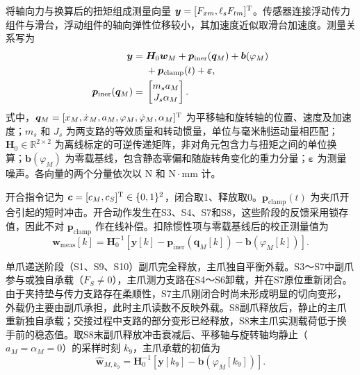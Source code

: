 \documentclass{JQRnew}
\begin{document}
将轴向力与换算后的扭矩组成测量向量 $\bm y=[F_{xm},\ell_sF_{tm}]^{\rm T}$。传感器连接浮动传力组件与滑台，浮动组件的轴向弹性位移较小，其加速度近似取滑台加速度。测量关系写为
\begin{align}
\label{eq:measurement}
\bm y={}&\bm H_0\bm w_M+\bm p_{\mathrm{iner}}(\bm q_M)
+\bm b(\varphi_M)\notag\\
&+\bm p_{\mathrm{clamp}}(t)+\bm\varepsilon,\\
\label{eq:inertia}
\bm p_{\mathrm{iner}}(\bm q_M)={}&
\begin{bmatrix}m_sa_M\\J_s\alpha_M\end{bmatrix}.
\end{align}
式中，$\bm q_M=[x_M,\dot x_M,a_M,\varphi_M,\dot\varphi_M,\alpha_M]^{\rm T}$ 为平移轴和旋转轴的位置、速度及加速度；$m_s$ 和 $J_s$ 为两支路的等效质量和转动惯量，单位与毫米制运动量相匹配；$\bm H_0\in\mathbb R^{2\times2}$ 为离线标定的可逆传递矩阵，非对角元包含力与扭矩之间的单位换算；$\bm b(\varphi_M)$ 为零载基线，包含静态零偏和随旋转角变化的重力分量；$\bm\varepsilon$ 为测量噪声。各向量的两个分量依次以 $\mathrm{N}$ 和 $\mathrm{N}\cdot\mathrm{mm}$ 计。

开合指令记为 $\bm c=[c_M,c_S]^{\rm T}\in\{0,1\}^2$，闭合取1、释放取0。$\bm p_{\mathrm{clamp}}(t)$ 为夹爪开合引起的短时冲击。开合动作发生在S3、S4、S7和S8，这些阶段的反馈采用锁存值，因此不对 $\bm p_{\mathrm{clamp}}$ 作在线补偿。扣除惯性项与零载基线后的校正测量值为
\begin{equation}
\label{eq:corrected-measurement}
\bm w_{\mathrm{meas}}[k]=\bm H_0^{-1}\!\left[
\bm y[k]-\bm p_{\mathrm{iner}}(\bm q_M[k])-\bm b(\varphi_M[k])\right].
\end{equation}

单爪递送阶段（S1、S9、S10）副爪完全释放，主爪独自平衡外载。S3～S7中副爪参与或独自承载（$F_S\neq0$），主爪测力支路在S4～S6卸载，并在S7原位重新闭合。由于夹持垫与传力支路存在柔顺性，S7主爪刚闭合时尚未形成明显的切向变形，外载仍主要由副爪承担，此时主爪读数不反映外载。S8副爪释放后，静止的主爪重新独自承载；交接过程中支路的部分变形已经释放，S8末主爪实测载荷低于换手前的稳态值。取S8末副爪释放冲击衰减后、平移轴与旋转轴均静止（$a_M=\alpha_M=0$）的采样时刻 $k_9$，主爪承载的初值为
\begin{equation}
\label{eq:initial-load}
\widehat{\bm w}_{M,k_9}
=\bm H_0^{-1}\!\left[\bm y[k_9]-\bm b(\varphi_M[k_9])\right].
\end{equation}
\end{document}

